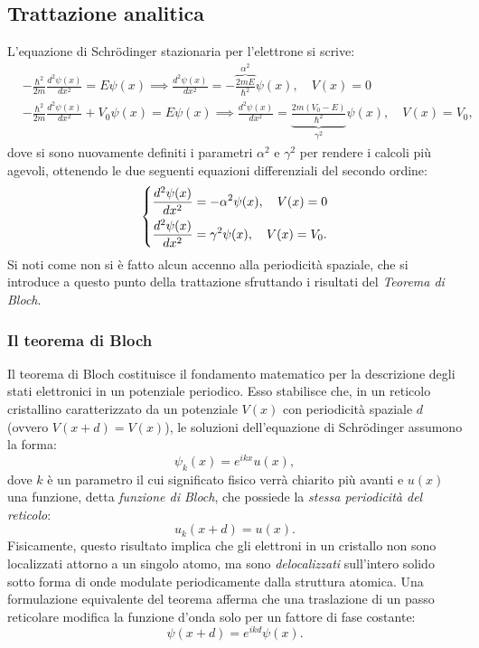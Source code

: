 \documentclass[a4paper,11pt]{report}
\begin{document}
\subsection{Trattazione analitica}
L'equazione di Schrödinger stazionaria per l'elettrone si scrive:
\begin{equation}
\begin{aligned}
&-\frac{\hbar^2}{2m}\frac{d^2\psi(x)}{dx^2} = E\psi(x) \implies \frac{d^2\psi(x)}{dx^2} = -\overbrace{\frac{2mE}{\hbar^2}}^{\alpha^2}\psi(x), \quad V(x) = 0 \\
&-\frac{\hbar^2}{2m}\frac{d^2\psi(x)}{dx^2} + V_0 \psi(x) = E\psi(x) \implies \frac{d^2\psi(x)}{dx^2} = \underbrace{\frac{2m(V_0-E)}{\hbar^2}}_{\gamma^2}\psi(x), \quad V(x) = V_0,
\end{aligned}
\end{equation}
dove si sono nuovamente definiti i parametri $\alpha^2$ e $\gamma^2$ per rendere i calcoli più agevoli, ottenendo le due seguenti equazioni differenziali del secondo ordine:
\begin{equation}
\begin{dcases}
\frac{d^2\psi(x)}{dx^2} = -\alpha^2\psi(x), \quad V(x) = 0 \\
\frac{d^2\psi(x)}{dx^2} = \gamma^2\psi(x), \quad V(x) = V_0.
\end{dcases}
\end{equation}
Si noti come non si è fatto alcun accenno alla periodicità spaziale, che si introduce a questo punto della trattazione sfruttando i risultati del \textit{Teorema di Bloch}.

\subsubsection{Il teorema di Bloch}
Il teorema di Bloch costituisce il fondamento matematico per la descrizione degli stati elettronici in un potenziale periodico.
Esso stabilisce che, in un reticolo cristallino caratterizzato da un potenziale $V(x)$ con periodicità spaziale $d$ (ovvero $V(x+d) = V(x)$), le soluzioni dell'equazione di Schrödinger assumono la forma:
\begin{equation}
    \psi_k(x) = e^{ikx} u(x),
\end{equation}
dove $k$ è un parametro il cui significato fisico verrà chiarito più avanti e $u(x)$ una funzione, detta \textit{funzione di Bloch}, che possiede la \textit{stessa periodicità del reticolo}:
    \begin{equation}
        u_k(x+d) = u(x).
    \end{equation}
Fisicamente, questo risultato implica che gli elettroni in un cristallo non sono localizzati attorno a un singolo atomo, ma sono \textit{delocalizzati} sull'intero solido sotto forma di onde modulate periodicamente dalla struttura atomica.
Una formulazione equivalente del teorema afferma che una traslazione di un passo reticolare modifica la funzione d'onda solo per un fattore di fase costante:
\begin{equation}
    \psi(x+d) = e^{ikd}\psi(x).
\end{equation}
\end{document}
